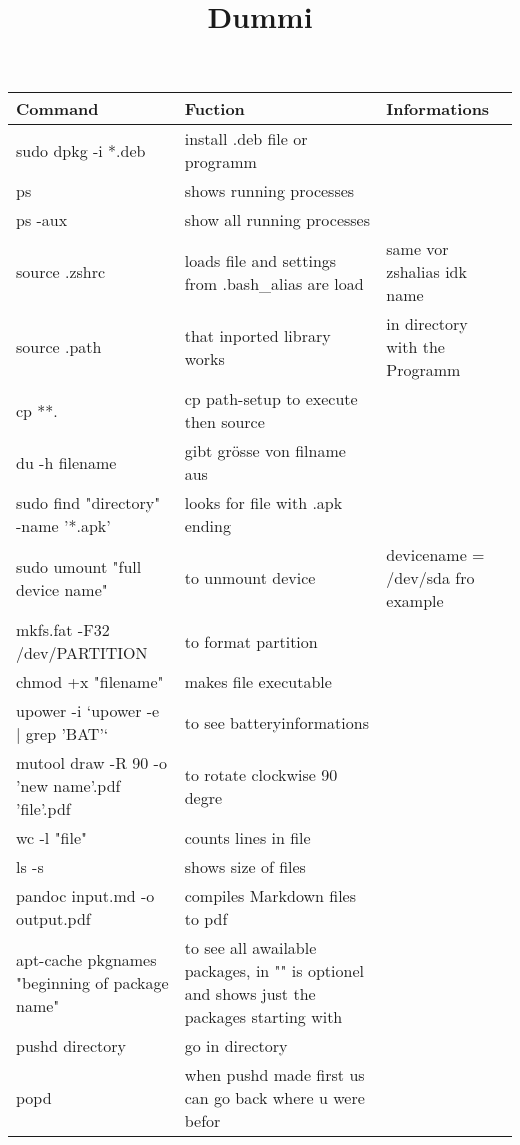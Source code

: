 \documentclass[12pt]{article}
\title{Dummi}
\begin{document}
\setlength{\parindent}{0pt}
\setlength{\parskip}{30pt}
\setlength{\baselineskip}{20pt}




\centering
\begin{tabular}{| p{6.5cm} | p{6.5cm} | p{6.5cm} |}
    \hline
    Command & Fuction & Informations \\
    \hline
    sudo dpkg -i *.deb & install .deb file or programm \\
    \hline
    ps & shows running processes & \\
    \hline
    ps -aux & show all running processes & \\
    \hline
    source .zshrc & loads file and settings from .bash\_alias are load & same vor zshalias idk name  \\
    \hline
    source .path & that inported library works & in directory with the Programm \\
    \hline 
    cp **. & cp path-setup to execute then source &\\
    \hline
    du -h filename & gibt grösse von filname aus & \\
    \hline
    sudo find "directory" -name '*.apk' & looks for file with .apk ending &\\
    \hline 
    sudo umount "full device name" & to unmount device & devicename = /dev/sda fro example\\
    \hline 
    mkfs.fat -F32 /dev/PARTITION & to format partition &\\
    \hline 
    chmod +x "filename" & makes file executable &\\
    \hline
    upower -i `upower -e | grep 'BAT'` & to see batteryinformations &\\
    \hline
    mutool draw -R 90 -o 'new name'.pdf 'file'.pdf & to rotate clockwise 90 degre &\\
    \hline 
    wc -l "file" & counts lines in file &\\
    \hline
    ls -s & shows size of files &\\
    \hline
    pandoc input.md -o output.pdf & compiles Markdown files to pdf & \\
    \hline
    apt-cache pkgnames "beginning of package name"& to see all awailable packages, in "" is optionel and shows just the packages starting with &\\
    \hline
    pushd directory & go in directory & \\
    \hline 
    popd & when pushd made first us can go back where u were befor &\\

\end{tabular}
\end{document}
